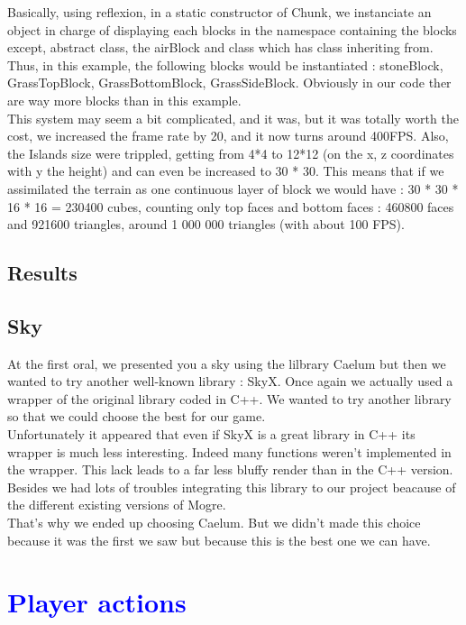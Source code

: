 \documentclass[article]{report} %
\begin{document}
Basically, using reflexion, in a static constructor of Chunk, we instanciate an object in charge of displaying each blocks in the namespace containing the blocks except, abstract class, the airBlock and class which has class inheriting from.\\
Thus, in this example, the following blocks would be instantiated : stoneBlock, GrassTopBlock, GrassBottomBlock, GrassSideBlock. Obviously in our code ther are way more blocks 
than in this example.\\


This system may seem a bit complicated, and it was, but it was totally worth the cost, we increased the frame rate by 20, and it now turns around 400FPS. Also, the Islands size were trippled, getting from 4*4 to 12*12 (on the x, z coordinates with y the height) and can even be increased to 30 * 30. This means that if we assimilated the terrain as one continuous layer of block we would have : 	30 * 30 * 16 * 16 = 230400 cubes, counting only top faces and bottom faces : 460800 faces and 921600 triangles, around 1 000 000 triangles (with about 100 FPS).
			\section{Results}
			
			\section{Sky}
				At the first oral, we presented you a sky using the lilbrary Caelum but then we wanted to try another well-known library : SkyX. Once again we actually used a wrapper of the original library coded in C++. We wanted to try another library so that we could choose the best for our game.\\
				
Unfortunately it appeared that even if SkyX is a great library in C++ its wrapper is much less interesting. Indeed many functions weren't implemented in the wrapper. This lack leads to a far less bluffy render than in the C++ version. Besides we had lots of troubles integrating this library to our project beacause of the different existing versions of Mogre.\\

That's why we ended up choosing Caelum. But we didn't made this choice because it was the first we saw but because this is the best one we can have.

		\chapter{\textcolor{blue}{Player actions}}
\end{document}
